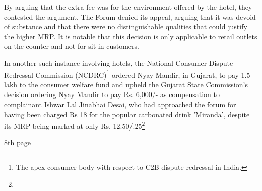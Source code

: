 \begin{multicols}{2}
\noi
By arguing that the extra fee was for the environment offered by the hotel, they contested the
argument. The Forum denied its appeal, arguing that it was devoid of substance and that there
were no distinguishable qualities that could justify the higher MRP. It is notable that this
decision is only applicable to retail outlets on the counter and not for sit-in customers.

\noi
In another such instance involving hotels, the National Consumer Dispute Redressal
Commission (NCDRC)\footnote{The apex consumer body with respect to C2B dispute redressal in India.} ordered Nyay Mandir, in Gujarat, to pay 1.5 lakh to the consumer
welfare fund and upheld the Gujarat State Commission's decision ordering Nyay Mandir to pay
Rs. 6,000/- as compensation to complainant Ishwar Lal Jinabhai Desai, who had approached the forum for having been charged Rs 18 for the popular carbonated drink 'Miranda', despite
its MRP being marked at only Rs. 12.50/.25\footnote{}

8th page
\end{multicols}
